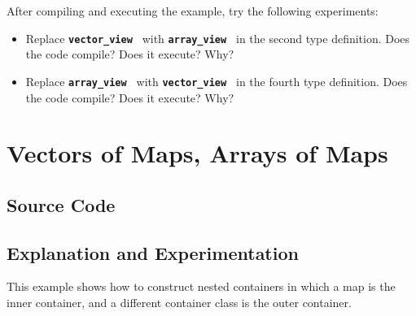 \documentclass{report}
\begin{document}
After compiling and executing the example, try the following experiments:
\begin{itemize}
\item
Replace
\texttt{{\bf vector\_view }}
with
\texttt{{\bf array\_view }}
in the second type definition.  Does the code compile?  Does it execute?
Why?

\item
Replace
\texttt{{\bf array\_view }}
with
\texttt{{\bf vector\_view }}
in the fourth type definition.  Does the code compile?  Does it execute?
Why?


\end{itemize}


\pagebreak
\section{Vectors of Maps, Arrays of Maps}

\subsection{Source Code}



\subsection{Explanation and Experimentation}

This example shows how to construct nested containers in which a map is
the inner container, and a different container class is the outer container.
\end{document}
